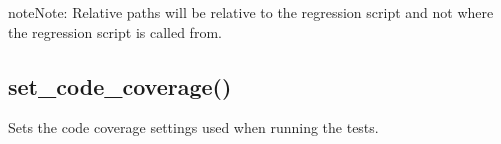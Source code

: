 \documentclass[letterpaper,10pt,english]{sphinxmanual}
\begin{document}
\sphinxAtStartPar
{}

\begin{sphinxVerbatim}[commandchars=\\\{\}]

 
\end{sphinxVerbatim}

\begin{sphinxadmonition}{note}{Note:}
\sphinxAtStartPar
Relative paths will be relative to the regression script
and not where the regression script is called from.
\end{sphinxadmonition}


\subsection{set\_code\_coverage()}
\label{\detokenize{api:set-code-coverage}}
\sphinxAtStartPar
Sets the code coverage settings used when running the tests.

\begin{sphinxVerbatim}[commandchars=\\\{\}]
   
\end{sphinxVerbatim}
\end{document}
